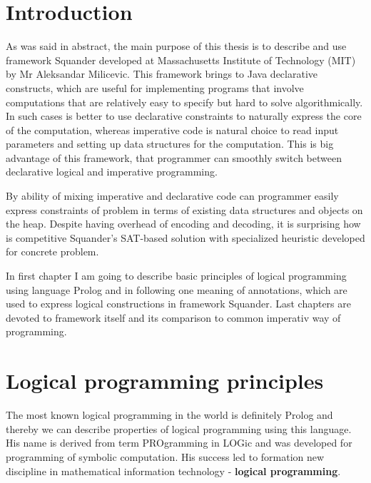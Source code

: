\documentclass[11pt,twoside,a4paper]{book}
\begin{document}


% 
% 

\chapter{Introduction}
As was said in abstract, the main purpose of this thesis is to describe and use
framework Squander developed at Massachusetts Institute of Technology (MIT) by Mr
Aleksandar Milicevic. This framework brings to Java declarative
constructs, which are useful for implementing programs that involve computations
that are relatively easy to specify but hard to solve algorithmically. In such
cases is better to use declarative constraints to naturally express the core of
the computation, whereas imperative code is natural choice to read input
parameters and setting up data structures for the computation. This is
big advantage of this framework, that programmer can smoothly switch between
declarative logical and imperative programming.

By ability of mixing imperative and declarative code can programmer easily
express constraints of problem in terms of existing data structures and objects
on the heap. Despite having overhead of encoding and decoding, it is surprising
how is competitive Squander's SAT-based solution with specialized heuristic
developed for concrete problem.

In first chapter I am going to describe basic principles of logical programming
using language Prolog and in following one meaning of annotations, which are
used to express logical constructions in framework Squander. Last chapters are
devoted to framework itself and its comparison to common imperativ way of
programming.
\chapter{Logical programming principles}
\label{chap:logProgPrinc}
The most known logical programming in the world is definitely Prolog and
thereby we can describe properties of logical programming using this language.
His name is derived from term PROgramming in LOGic and was developed for
programming of symbolic computation. His success led to formation new discipline
in mathematical information technology - \textbf{logical programming}.
\end{document}
